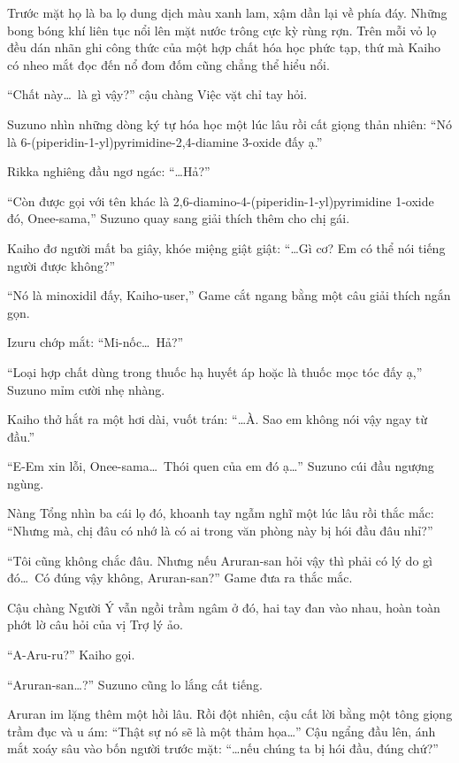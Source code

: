 \documentclass[../main.tex]{subfiles}
\begin{document}
Trước mặt họ là ba lọ dung dịch màu xanh lam, xậm dần lại về phía đáy. Những bong bóng khí liên tục nổi lên mặt nước trông cực kỳ rùng rợn. Trên mỗi vỏ lọ đều dán nhãn ghi công thức của một hợp chất hóa học phức tạp, thứ mà Kaiho có nheo mắt đọc đến nổ đom đốm cũng chẳng thể hiểu nổi.


``Chất này\dots\ là gì vậy?'' cậu chàng Việc vặt chỉ tay hỏi.

Suzuno nhìn những dòng ký tự hóa học một lúc lâu rồi cất giọng thản nhiên: ``Nó là 6-(piperidin-1-yl)pyrimidine-2,4-diamine 3-oxide đấy ạ.''

Rikka nghiêng đầu ngơ ngác: ``\dots Hả?''

``Còn được gọi với tên khác là 2,6-diamino-4-(piperidin-1-yl)pyrimidine 1-oxide đó, Onee-sama,'' Suzuno quay sang giải thích thêm cho chị gái.

Kaiho đơ người mất ba giây, khóe miệng giật giật: ``\dots Gì cơ? Em có thể nói tiếng người được không?''

``Nó là minoxidil đấy, Kaiho-user,'' Game cắt ngang bằng một câu giải thích ngắn gọn.

Izuru chớp mắt: ``Mi-nốc\dots\ Hả?''

``Loại hợp chất dùng trong thuốc hạ huyết áp hoặc là thuốc mọc tóc đấy ạ,'' Suzuno mỉm cười nhẹ nhàng.

Kaiho thở hắt ra một hơi dài, vuốt trán: ``\dots À. Sao em không nói vậy ngay từ đầu.''

``E-Em xin lỗi, Onee-sama\dots\ Thói quen của em đó ạ\dots'' Suzuno cúi đầu ngượng ngùng.

Nàng Tổng nhìn ba cái lọ đó, khoanh tay ngẫm nghĩ một lúc lâu rồi thắc mắc: ``Nhưng mà, chị đâu có nhớ là có ai trong văn phòng này bị hói đầu đâu nhỉ?''

``Tôi cũng không chắc đâu. Nhưng nếu Aruran-san hỏi vậy thì phải có lý do gì đó\dots\ Có đúng vậy không, Aruran-san?'' Game đưa ra thắc mắc.

Cậu chàng Người Ý vẫn ngồi trầm ngâm ở đó, hai tay đan vào nhau, hoàn toàn phớt lờ câu hỏi của vị Trợ lý ảo.

``A-Aru-ru?'' Kaiho gọi.

``Aruran-san\dots?'' Suzuno cũng lo lắng cất tiếng.

Aruran im lặng thêm một hồi lâu. Rồi đột nhiên, cậu cất lời bằng một tông giọng trầm đục và u ám: ``Thật sự nó sẽ là một thảm họa\dots'' Cậu ngẩng đầu lên, ánh mắt xoáy sâu vào bốn người trước mặt: ``\dots nếu chúng ta bị hói đầu, đúng chứ?''
\end{document}
